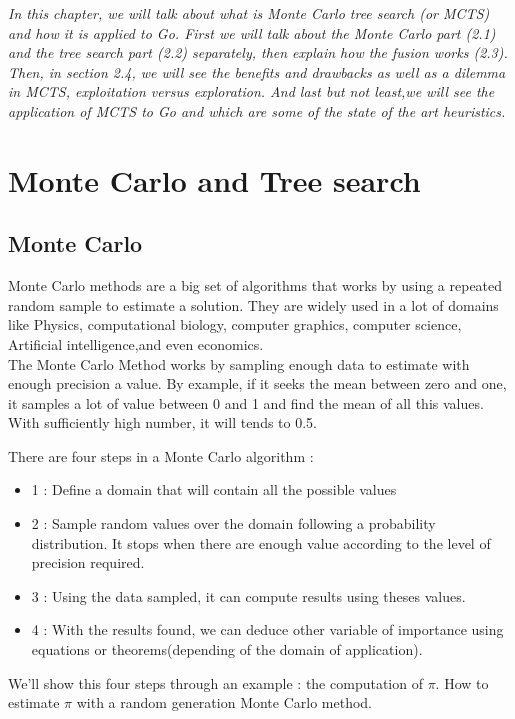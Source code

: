 
\textit{In this chapter, we will talk about what is Monte Carlo tree search (or MCTS) and how it is applied to Go.
First we will talk about the Monte Carlo part (2.1) and the tree search part (2.2) separately, then explain how the fusion works (2.3).
Then, in section 2.4, we will see the benefits and drawbacks as well as a dilemma in MCTS, exploitation versus exploration. 
And last but not least,we will see the application of MCTS to Go and which are some of the state of the art heuristics. }

\section{Monte Carlo and Tree search}

\subsection{Monte Carlo}

Monte Carlo methods are a big set of algorithms that works by using a repeated random sample to estimate a solution. They are widely used in a lot of domains like Physics, computational biology, computer graphics, computer science, Artificial intelligence,and even economics. 
\\

The Monte Carlo Method works by sampling enough data to estimate with enough precision a value. By example, if it seeks the mean between zero and one, it samples a lot of value between 0 and 1 and find the mean of all this values. With sufficiently high number, it will tends to 0.5. 

There are four steps in a Monte Carlo algorithm : 

\begin{itemize}
\item 1 : Define a domain that will contain all the possible values 
\item 2 : Sample random values over the domain following a probability distribution. It stops when there are enough value according to the level of precision required. 
\item 3 : Using the data sampled, it can compute results using theses values. 
\item 4 : With the results found, we can deduce other variable of importance using equations or theorems(depending of the domain of application). 
\end{itemize} 

We'll show this four steps through an example : the computation of $\pi$. How to estimate $\pi$ with a random generation Monte Carlo method. 

